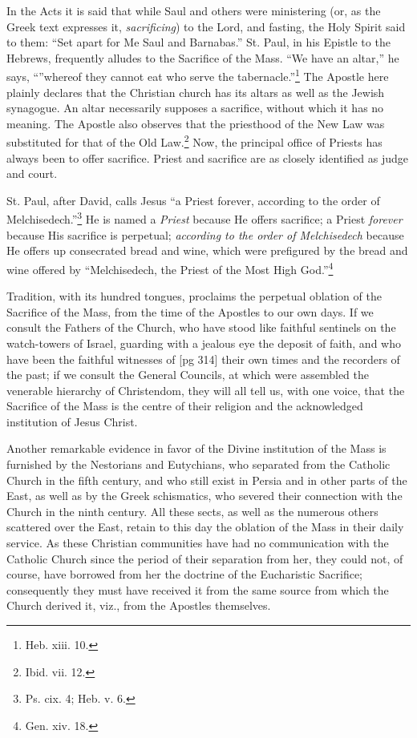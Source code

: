 In the Acts it is said that while Saul and others
were ministering (or, as the Greek text expresses
it, \emph{sacrificing}) to the Lord, and fasting, the Holy
Spirit said to them: “Set apart for Me Saul and
Barnabas.” St. Paul, in his Epistle to the Hebrews,
frequently alludes to the Sacrifice of the
Mass. “We have an altar,” he says, “''whereof
they cannot eat who serve the tabernacle.”\footnote{Heb.
xiii. 10.} The
Apostle here plainly declares that the Christian
church has its altars as well as the Jewish synagogue.
An altar necessarily supposes a sacrifice,
without which it has no meaning. The Apostle
also observes that the priesthood of the New Law
was substituted for that of the Old Law.\footnote{Ibid. vii. 12.}
Now, the principal office of Priests has always been to
offer sacrifice. Priest and sacrifice are as closely
identified as judge and court.

St. Paul, after David, calls Jesus “a Priest forever,
according to the order of Melchisedech.”\footnote{Ps.
cix. 4; Heb. v. 6.}
He is named a \emph{Priest} because He offers sacrifice;
a Priest \emph{forever} because His sacrifice is perpetual;
\emph{according to the order of Melchisedech} because
He offers up consecrated bread and wine,
which were prefigured by the bread and wine offered
by “Melchisedech, the Priest of the Most
High God.”\footnote{Gen. xiv. 18.}

Tradition, with its hundred tongues, proclaims
the perpetual oblation of the Sacrifice of the Mass,
from the time of the Apostles to our own days. If
we consult the Fathers of the Church, who have
stood like faithful sentinels on the watch-towers of
Israel, guarding with a jealous eye the deposit of
faith, and who have been the faithful witnesses of
[pg 314]
their own times and the recorders of the past; if
we consult the General Councils, at which were assembled
the venerable hierarchy of Christendom,
they will all tell us, with one voice, that the Sacrifice
of the Mass is the centre of their religion and
the acknowledged institution of Jesus Christ.

Another remarkable evidence in favor of the
Divine institution of the Mass is furnished by the
Nestorians and Eutychians, who separated from
the Catholic Church in the fifth century, and who
still exist in Persia and in other parts of the East,
as well as by the Greek schismatics, who severed
their connection with the Church in the ninth century.
All these sects, as well as the numerous
others scattered over the East, retain to this day
the oblation of the Mass in their daily service. As
these Christian communities have had no communication
with the Catholic Church since the
period of their separation from her, they could
not, of course, have borrowed from her the doctrine
of the Eucharistic Sacrifice; consequently
they must have received it from the same source
from which the Church derived it, viz., from the
Apostles themselves.

